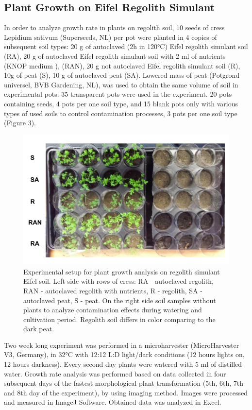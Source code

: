 \documentclass[preprint]{elsarticle}
\begin{document}
\subsection{Plant Growth on Eifel Regolith Simulant}
In order to analyze growth rate in plants on regolith soil, 10 seeds of cress Lepidium sativum (Superseeds, NL) per pot were planted in 4 copies of subsequent soil types: 20 g of autoclaved (2h in 120°C) Eifel regolith simulant soil (RA), 20 g of autoclaved Eifel regolith simulant soil with 2 ml of nutrients (KNOP medium \cite{ref17}), (RAN), 20 g not autoclaved Eifel regolith simulant soil (R), 10g of peat (S), 10 g of autoclaved peat (SA). Lowered mass of peat (Potgrond universel, BVB Gardening, NL), was used to obtain the same volume of soil in experimental pots. 35 transparent pots were used in the experiment. 20 pots containing seeds, 4 pots per one soil type, and 15 blank pots only with various types of used soils to control contamination processes, 3 pots per one soil type (Figure 3).

\begin{figure}
\centering
\includegraphics{img/figure03.png}
\caption{Experimental setup for plant growth analysis on regolith simulant Eifel soil. Left side with rows of cress: RA - autoclaved regolith, RAN - autoclaved regolith with nutrients, R - regolith, SA - autoclaved peat, S - peat. On the right side soil samples without plants to analyze contamination effects during watering and cultivation period. Regolith soil differs in color comparing to the dark peat.}
\end{figure}

Two week long experiment was performed in a microharvester (MicroHarvester V3, Germany), in 32°C with 12:12 L:D light/dark conditions (12 hours lights on, 12 hours darkness). Every second day plants were watered with 5 ml of distilled water. Growth rate analysis was performed based on data collected in four subsequent days of the fastest morphological plant transformation (5th, 6th, 7th and 8th day of the experiment), by using imaging method. Images were processed and measured in ImageJ Software. Obtained data was analyzed in Excel.
\end{document}
